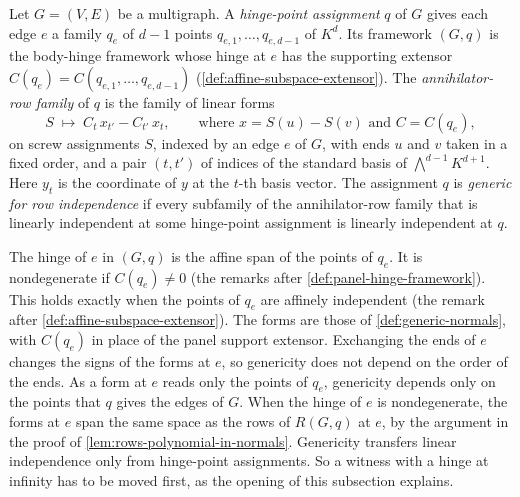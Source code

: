 \begin{definition}
  \label{def:generic-hinge-points}
  \leanok
  Let $G = (V, E)$ be a multigraph. A \emph{hinge-point assignment} $q$
  of $G$ gives each edge $e$ a family $q_e$ of $d - 1$ points
  $q_{e,1}, \dots, q_{e,d-1}$ of $K^d$. Its framework $(G, q)$ is the
  body-hinge framework whose hinge at $e$ has the supporting extensor
  $C(q_e) = C(q_{e,1}, \dots, q_{e,d-1})$
  (\cref{def:affine-subspace-extensor}). The \emph{annihilator-row
  family} of $q$ is the family of linear forms
  \[
    S \;\mapsto\; C_t\, x_{t'} - C_{t'}\, x_t,
    \qquad \text{where } x = S(u) - S(v) \text{ and } C = C(q_e),
  \]
  on screw assignments $S$, indexed by an edge $e$ of $G$, with ends
  $u$ and $v$ taken in a fixed order, and a pair $(t, t')$ of indices
  of the standard basis of $\bigwedge^{d-1}K^{d+1}$. Here $y_t$ is the
  coordinate of $y$ at the $t$-th basis vector. The assignment $q$ is
  \emph{generic for row independence} if every subfamily of the
  annihilator-row family that is linearly independent at some
  hinge-point assignment is linearly independent at $q$.
\end{definition}

The hinge of $e$ in $(G, q)$ is the affine span of the points of
$q_e$. It is nondegenerate if $C(q_e) \neq 0$ (the remarks after
\cref{def:panel-hinge-framework}). This holds exactly when the points
of $q_e$ are affinely independent (the remark after
\cref{def:affine-subspace-extensor}). The forms are those of
\cref{def:generic-normals}, with $C(q_e)$ in place of the panel support
extensor. Exchanging the ends of $e$ changes the signs of the forms at
$e$, so genericity does not depend on the order of the ends. As a form
at $e$ reads only the points of $q_e$, genericity depends only on the
points that $q$ gives the edges of $G$. When the
hinge of $e$ is nondegenerate, the forms at $e$ span the same space as
the rows of $R(G, q)$ at $e$, by the argument in the proof of
\cref{lem:rows-polynomial-in-normals}. Genericity transfers linear
independence only from hinge-point assignments. So a witness with a
hinge at infinity has to be moved first, as the opening of this
subsection explains.

